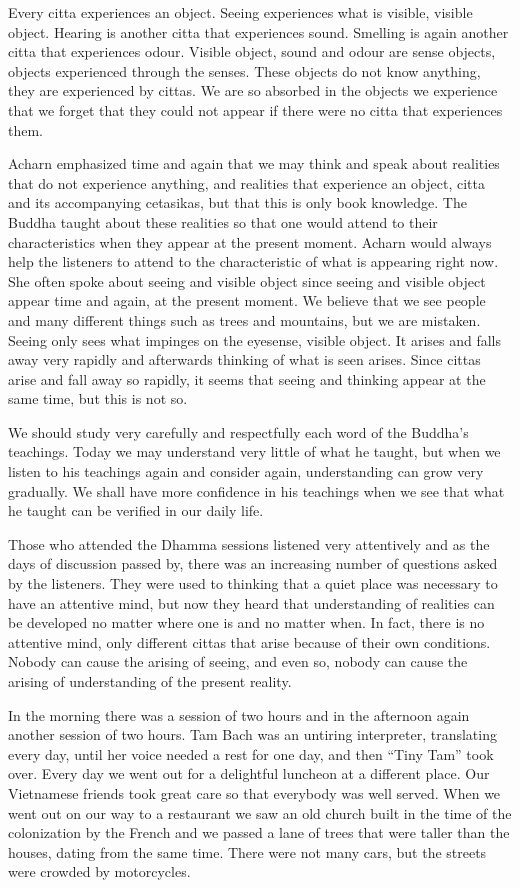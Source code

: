 Every citta experiences an object.
Seeing experiences what is visible, visible object. Hearing is another
citta that experiences sound. Smelling is again another citta that
experiences odour. Visible object, sound and odour are sense objects,
objects experienced through the senses. These objects do not know
anything, they are experienced by cittas. We are so absorbed in the
objects we experience that we forget that they could not appear if there
were no citta that experiences them. 

Acharn emphasized time and again that
we may think and speak about realities that do not experience anything,
and realities that experience an object, citta and its accompanying
cetasikas, but that this is only book knowledge. The Buddha taught about
these realities so that one would attend to their characteristics when
they appear at the present moment. Acharn would always help the
listeners to attend to the characteristic of what is appearing right
now. She often spoke about seeing and visible object since seeing and
visible object appear time and again, at the present moment. We believe
that we see people and many different things such as trees and
mountains, but we are mistaken. Seeing only sees what impinges on the
eyesense, visible object. It arises and falls away very rapidly and
afterwards thinking of what is seen arises. Since cittas arise and fall
away so rapidly, it seems that seeing and thinking appear at the same
time, but this is not so. 

We should study very carefully and respectfully each word of the
Buddha's teachings. Today we may understand very little of what he
taught, but when we listen to his teachings again and consider again,
understanding can grow very gradually. We shall have more confidence in
his teachings when we see that what he taught can be verified in our
daily life.

Those who attended the Dhamma sessions
listened very attentively and as the days of discussion passed by, there
was an increasing number of questions asked by the listeners. They were
used to thinking that a quiet place was necessary to have an attentive
mind, but now they heard that understanding of realities can be
developed no matter where one is and no matter when. In fact, there is
no attentive mind, only different cittas that arise because of their own
conditions. Nobody can cause the arising of seeing, and even so, nobody
can cause the arising of understanding of the present reality. 

In the morning there was a session of
two hours and in the afternoon again another session of two hours. Tam
Bach was an untiring interpreter, translating every day, until her voice
needed a rest for one day, and then ``Tiny Tam'' took over. Every day we
went out for a delightful luncheon at a different place. Our Vietnamese
friends took great care so that everybody was well served. When we went
out on our way to a restaurant we saw an old church built in the time of
the colonization by the French and we passed a lane of trees that were
taller than the houses, dating from the same time. There were not many
cars, but the streets were crowded by motorcycles. 

